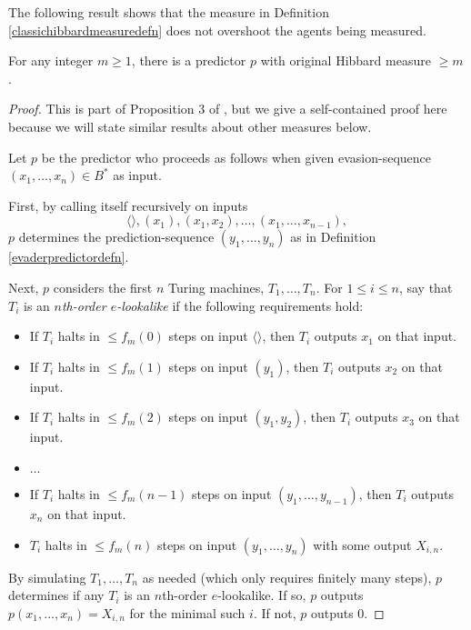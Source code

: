 \documentclass[twoside,11pt]{article}
\begin{document}
The following result shows that the measure in
Definition \ref{classichibbardmeasuredefn} does not overshoot the agents being
measured.

\begin{proposition}
\label{complicatedproposition}
    For any integer $m\geq 1$, there is a predictor $p$ with original Hibbard
    measure $\geq m$.
\end{proposition}

\begin{proof}
    This is part of Proposition 3 of \citet{hibbard}, but we give a self-contained
    proof here because we will state similar results about other measures below.

    Let $p$ be the predictor who proceeds as follows when given
    evasion-sequence $(x_1,\ldots,x_n)\in B^*$ as input.

    First, by calling itself recursively on inputs
    \[\langle\rangle, (x_1), (x_1,x_2), \ldots, (x_1,\ldots,x_{n-1}),\]
    $p$ determines the prediction-sequence $(y_1,\ldots,y_n)$ as in
    Definition \ref{evaderpredictordefn}.

    Next, $p$ considers the first $n$ Turing machines, $T_1,\ldots,T_n$.
    For $1\leq i\leq n$, say that $T_i$ is an \emph{$n$th-order $e$-lookalike} if
    the following requirements hold:
    \begin{itemize}
        \item If $T_i$ halts in $\leq f_m(0)$ steps on input
        $\langle\rangle$, then $T_i$ outputs $x_1$ on that input.
        \item If $T_i$ halts in $\leq f_m(1)$ steps on input
        $(y_1)$, then $T_i$ outputs $x_2$ on that input.
        \item If $T_i$ halts in $\leq f_m(2)$ steps on input
        $(y_1,y_2)$, then $T_i$ outputs $x_3$ on that input.
        \item $\ldots$
        \item If $T_i$ halts in $\leq f_m(n-1)$ steps on input
        $(y_1,\ldots,y_{n-1})$, then $T_i$ outputs $x_n$ on that input.
        \item $T_i$ halts in $\leq f_m(n)$ steps on input
        $(y_1,\ldots,y_n)$ with some output $X_{i,n}$.
    \end{itemize}
    By simulating $T_1,\ldots,T_n$ as needed (which only requires finitely many steps),
    $p$ determines if any $T_i$ is an $n$th-order $e$-lookalike.
    If so, $p$ outputs $p(x_1,\ldots,x_n)=X_{i,n}$ for the minimal such $i$.
    If not, $p$ outputs $0$.


\end{proof}
\end{document}
